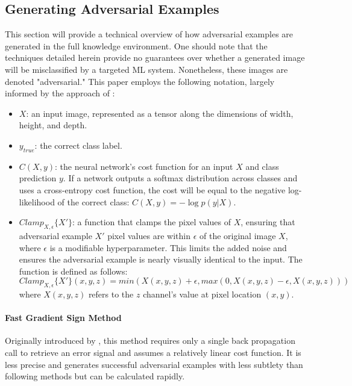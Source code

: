 \documentclass[]{article}
\begin{document}
\subsection{Generating Adversarial Examples}

This section will provide a technical overview of how adversarial examples are generated in the full knowledge environment. One should note that the techniques detailed herein provide no guarantees over whether a generated image will be misclassified by a targeted ML system. Nonetheless, these images are denoted "adversarial." This paper employs the following notation, largely informed by the approach of \citet{DBLP:journals/corr/KurakinGB16}:
\begin{itemize}
    \item $X$: an input image, represented as a tensor along the dimensions of width, height, and depth.
    \item $y_{true}$: the correct class label.
    \item $C(X,y)$: the neural network's cost function for an input $X$ and class prediction $y$. If a network outputs a softmax distribution across classes and uses a cross-entropy cost function, the cost will be equal to the negative log-likelihood of the correct class: $C(X,y)=-\log p(y|X)$.
    \item $Clamp_{X,\epsilon}\{X'\}$: a function that clamps the pixel values of $X$, ensuring that adversarial example $X'$ pixel values are within $\epsilon$ of the original image $X$, where $\epsilon$ is a modifiable hyperparameter. This limits the added noise and ensures the adversarial example is nearly visually identical to the input. The function is defined as follows:
    $$Clamp_{X,\epsilon}\{X'\}(x,y,z)=min(X(x,y,z) + \epsilon, max(0, X(x,y,z)-\epsilon, X(x,y,z)))$$
    where $X(x,y,z)$ refers to the $z$ channel's value at pixel location $(x,y)$.
\end{itemize}

\paragraph{Fast Gradient Sign Method}

Originally introduced by \citet{goodfellow2014}, this method requires only a single back propagation call to retrieve an error signal and assumes a relatively linear cost function. It is less precise and generates successful adversarial examples with less subtlety than following methods but can be calculated rapidly.
\end{document}
